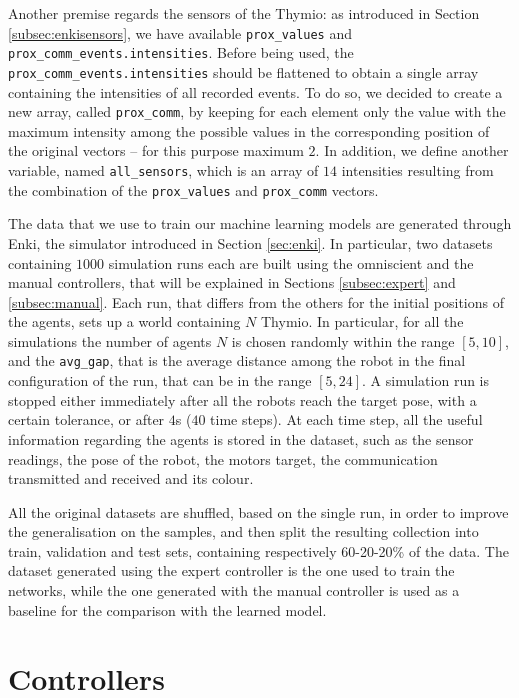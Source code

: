 Another premise regards the sensors of the Thymio: as introduced in Section 
\ref{subsec:enkisensors}, we have available \texttt{prox\_values} and 
\texttt{prox\_comm\_events.intensities}. Before being used, the 
\texttt{prox\_comm\_events.intensities} should be flattened to obtain a single 
array containing the intensities of all recorded events. 
To do so, we decided to create a new array, called \texttt{prox\_comm}, by 
keeping for each element only the value with the maximum intensity among the 
possible values in the corresponding position of the original vectors – for this 
purpose maximum $2$.
In addition, we define another variable, named \texttt{all\_sensors}, which is an 
array of $14$ intensities resulting from the combination of the 
\texttt{prox\_values} and \texttt{prox\_comm} vectors.

The data that we use to train our machine learning models are generated through 
Enki, the simulator introduced in Section \ref{sec:enki}.
In particular, two datasets containing $1000$ simulation runs each are built using 
the omniscient and the manual controllers, that will be explained in Sections 
\ref{subsec:expert} and \ref{subsec:manual}. 
Each run, that differs from the others for the initial positions of the agents, sets up 
a world containing $N$ Thymio. 
In particular, for all the simulations the number of agents $N$ is chosen randomly 
within the range $[5, 10]$, and the \texttt{avg\_gap}, that is the average distance 
among the robot in the final configuration of the run, that can be in the range 
$[5, 24]$.
A simulation run is stopped either immediately after all the robots reach the 
target pose, with a certain tolerance, or after $4$s ($40$ time steps).
At each time step, all the useful information regarding the agents is stored in 
the dataset, such as the sensor readings, the pose of the robot, the motors target, 
the communication transmitted and received and its colour.

All the original datasets are shuffled, based on the single run, in order to improve 
the generalisation on the samples, and then split the resulting collection into 
train, validation and test sets, containing respectively 60-20-20\% of the data.
The dataset generated using the expert controller is the one used to train the 
networks, while the one generated with the manual controller is used as a 
baseline for the comparison with the learned model.

\section{Controllers}
\label{sec:controllersmodel}

